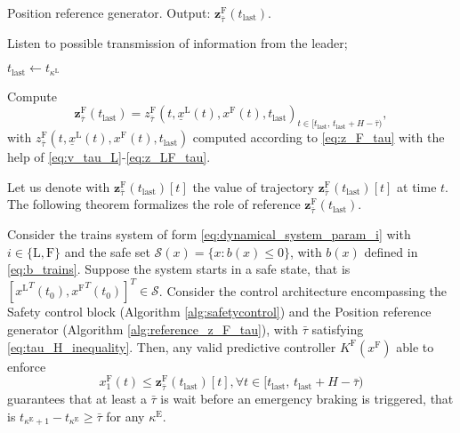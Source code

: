 \begin{algorithm}
	\caption{Position reference generator. Output: $\mathbf{z}_{\bar{\tau}}^\mathrm{F}(t_{\mathrm{last}})$. }\label{alg:reference_z_F_tau}
	\begin{algorithmic}[1]
		\Loop
		
		\State Listen to possible transmission of information from the leader;
		
		
		\State $t_{\mathrm{last}} \leftarrow t_{\kappa^\mathrm{L}}$
		
		\State Compute
		\begin{equation}\label{eq:reference_z_F_tau}
			\mathbf{z}_{\bar{\tau}}^\mathrm{F}(t_{\mathrm{last}})={z_{\bar{\tau}}^\mathrm{F}(t,\underline{x}^\mathrm{L}(t),x^\mathrm{F}(t),t_{\mathrm{last}})}_{t\in [t_{\mathrm{last}}, \, t_{\mathrm{last}}+H-\bar{\tau} )},
		\end{equation}
		with $z_{\bar{\tau}}^\mathrm{F}(t,\underline{x}^\mathrm{L}(t),x^\mathrm{F}(t),t_{\mathrm{last}})$ computed according to \eqref{eq:z_F_tau} with the help of \eqref{eq:v_tau_L}\--\eqref{eq:z_LF_tau}.
		
		
		\EndIf
		
		
		\EndLoop
		
	\end{algorithmic}
\end{algorithm}


Let us denote with  $\mathbf{z}_{\bar{\tau}}^\mathrm{F}(t_{\mathrm{last}})[t]$ the value of trajectory $\mathbf{z}_{\bar{\tau}}^\mathrm{F}(t_{\mathrm{last}})[t]$ at time $t$.
The following theorem formalizes the role of reference $\mathbf{z}_{\bar{\tau}}^\mathrm{F}(t_{\mathrm{last}})$. 

\begin{theorem}\label{thm:tau_far_control}
	Consider the trains system of form \eqref{eq:dynamical_system_param_i} with $i\in\{\mathrm{L},\mathrm{F}\}$ and the safe set $\mathcal{S}(x)=\{x: b(x)\leq 0\}$, with $b(x)$ defined in \eqref{eq:b_trains}. 
	Suppose the system starts in a safe state, that is $[{x^\mathrm{L}}^T(t_0),{x^\mathrm{F}}^T(t_0)]^T\in\mathcal{S}$. Consider the control architecture encompassing  the Safety control block (Algorithm \ref{alg:safetycontrol}) and the Position reference generator (Algorithm \ref{alg:reference_z_F_tau}), with $\bar{\tau}$ satisfying \eqref{eq:tau_H_inequality}. Then, any valid predictive controller $K^\mathrm{F}(x^\mathrm{F})$ able to enforce
	\begin{equation}\label{eq:tau_far_constraint}
		x_1^\mathrm{F}(t)\leq  \mathbf{z}_{\bar{\tau}}^\mathrm{F}(t_{\mathrm{last}})[t], \forall t \in [t_{\mathrm{last}}, \, t_{\mathrm{last}}+H-\bar{\tau})
	\end{equation} 
	guarantees that at least a $\bar{\tau}$ is wait before an emergency braking is triggered, that is
	$ t_{\kappa^\mathrm{E} +1} -t_{\kappa^\mathrm{E}}\geq \bar{\tau}$ for any  $\kappa^\mathrm{E}$.
	
\end{theorem}

